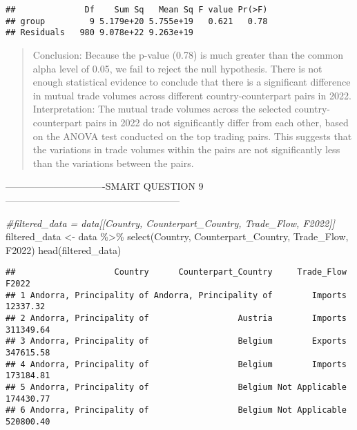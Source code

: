 \documentclass[
]{article}
\newenvironment{Shaded}{\begin{snugshade}}{\end{snugshade}}
\newcommand{\CommentTok}[1]{\textcolor[rgb]{0.56,0.35,0.01}{\textit{#1}}}
\newcommand{\FunctionTok}[1]{\textcolor[rgb]{0.00,0.00,0.00}{#1}}
\newcommand{\NormalTok}[1]{#1}
\newcommand{\OtherTok}[1]{\textcolor[rgb]{0.56,0.35,0.01}{#1}}
\newcommand{\SpecialCharTok}[1]{\textcolor[rgb]{0.00,0.00,0.00}{#1}}
\begin{document}
\begin{verbatim}
##              Df    Sum Sq   Mean Sq F value Pr(>F)
## group         9 5.179e+20 5.755e+19   0.621   0.78
## Residuals   980 9.078e+22 9.263e+19
\end{verbatim}

\begin{quote}
Conclusion: Because the p-value (0.78) is much greater than the common
alpha level of 0.05, we fail to reject the null hypothesis. There is not
enough statistical evidence to conclude that there is a significant
difference in mutual trade volumes across different country-counterpart
pairs in 2022. Interpretation: The mutual trade volumes across the
selected country-counterpart pairs in 2022 do not significantly differ
from each other, based on the ANOVA test conducted on the top trading
pairs. This suggests that the variations in trade volumes within the
pairs are not significantly less than the variations between the pairs.
\end{quote}

-------------------------------SMART QUESTION
9------------------------------------------------------

\begin{Shaded}
\begin{Highlighting}[]
\CommentTok{\#filtered\_data = data[[\textquotesingle{}Country\textquotesingle{}, \textquotesingle{}Counterpart\_Country\textquotesingle{}, \textquotesingle{}Trade\_Flow\textquotesingle{}, \textquotesingle{}F2022\textquotesingle{}]]}
\NormalTok{filtered\_data }\OtherTok{\textless{}{-}}\NormalTok{ data }\SpecialCharTok{\%\textgreater{}\%}
  \FunctionTok{select}\NormalTok{(Country, Counterpart\_Country, Trade\_Flow, F2022)}
\FunctionTok{head}\NormalTok{(filtered\_data)}
\end{Highlighting}
\end{Shaded}

\begin{verbatim}
##                    Country      Counterpart_Country     Trade_Flow     F2022
## 1 Andorra, Principality of Andorra, Principality of        Imports  12337.32
## 2 Andorra, Principality of                  Austria        Imports 311349.64
## 3 Andorra, Principality of                  Belgium        Exports 347615.58
## 4 Andorra, Principality of                  Belgium        Imports 173184.81
## 5 Andorra, Principality of                  Belgium Not Applicable 174430.77
## 6 Andorra, Principality of                  Belgium Not Applicable 520800.40
\end{verbatim}
\end{document}
